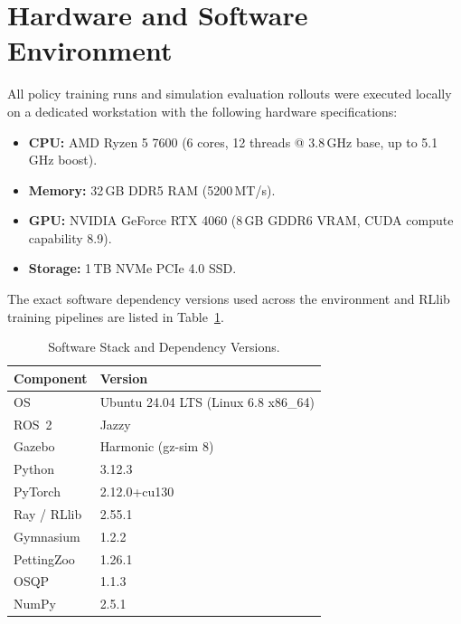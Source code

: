 \documentclass[11pt]{article}
\begin{document}
\section{Hardware and Software Environment}
\label{sec:versions}
All policy training runs and simulation evaluation rollouts were executed locally on a dedicated workstation with the following hardware specifications:
\begin{itemize}
    \item \textbf{CPU:} AMD Ryzen 5 7600 (6 cores, 12 threads @ 3.8\,GHz base, up to 5.1\,GHz boost).
    \item \textbf{Memory:} 32\,GB DDR5 RAM (5200\,MT/s).
    \item \textbf{GPU:} NVIDIA GeForce RTX 4060 (8\,GB GDDR6 VRAM, CUDA compute capability 8.9).
    \item \textbf{Storage:} 1\,TB NVMe PCIe 4.0 SSD.
\end{itemize}
The exact software dependency versions used across the environment and RLlib training pipelines are listed in Table~\ref{tab:software-versions}.

\begin{table}[h]
\centering
\small
\caption{Software Stack and Dependency Versions.}
\label{tab:software-versions}
\begin{tabular}{ll}
\toprule
Component & Version \\
\midrule
OS & Ubuntu 24.04 LTS (Linux 6.8 x86\_64) \\
ROS~2 & Jazzy \\
Gazebo & Harmonic (gz-sim 8) \\
Python & 3.12.3 \\
PyTorch & 2.12.0+cu130 \\
Ray / RLlib & 2.55.1 \\
Gymnasium & 1.2.2 \\
PettingZoo & 1.26.1 \\
OSQP & 1.1.3 \\
NumPy & 2.5.1 \\
\bottomrule
\end{tabular}
\end{table}



\end{document}
